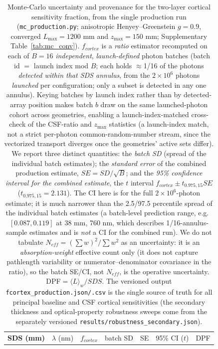 \documentclass[11pt]{article}
\def\mathrm#1{#1}%
\def\,{ }%
\begin{document}
\begin{table}[ht]
\centering
\caption{Monte-Carlo uncertainty and provenance for the two-layer cortical sensitivity fraction, from the single production run (\texttt{mc\_production.py}; anisotropic Henyey--Greenstein $g=0.9$, converged $L_{\max}=1200$\,mm and $z_{\max}=150$\,mm; Supplementary Table~\ref{tab:mc_conv}). $f_{\mathrm{cortex}}$ is a \emph{ratio} estimator recomputed on each of $B=16$ \emph{independent}, \emph{launch-defined} photon batches (batch id $=$ launch index mod $B$; each holds $\approx$1/16 of the photons \emph{detected within that SDS annulus}, from the $2\times10^{6}$ photons \emph{launched} per configuration; only a subset is detected in any one annulus). Keying batches by launch index rather than by detected-array position makes batch $b$ draw on the same launched-photon cohort across geometries, enabling a launch-index-matched cross-check of the CSF-ratio and $z_{\max}$ statistics (a launch-index match, not a strict per-photon common-random-number stream, since the vectorized transport diverges once the geometries' active sets differ). We report three distinct quantities: the \emph{batch SD} (spread of the individual batch estimates); the \emph{standard error} of the combined production estimate, $\mathrm{SE}=\mathrm{SD}/\sqrt{B}$; and the \emph{95\% confidence interval for the combined estimate}, the $t$ interval $f_{\mathrm{cortex}}\pm t_{0.975,15}\,\mathrm{SE}$ ($t_{0.975,15}=2.131$). The CI here is for the full $2\times10^{6}$-photon estimate; it is much narrower than the 2.5/97.5 percentile spread of the individual batch estimates (a batch-level prediction range, e.g.\ $[0.087,0.119]$ at 38\,mm, 760\,nm, which describes 1/16-annulus-sample estimates and is \emph{not} a CI for the combined run). We do not tabulate $N_{\mathrm{eff}}=(\sum w)^2/\sum w^2$ as an uncertainty: it is an \emph{absorption-weight} effective count only (it does not capture pathlength variability or numerator--denominator covariance in the ratio), so the batch SE/CI, not $N_{\mathrm{eff}}$, is the operative uncertainty. DPF$\,=\langle L\rangle_w/\mathrm{SDS}$. The versioned output \texttt{fcortex\_production.json/.csv} is the single source of truth for all principal baseline and CSF cortical sensitivities (the secondary thickness and optical-property robustness sweeps come from the separately versioned \texttt{results/robustness\_secondary.json}).}
\label{tab:mc_unc}
\begin{tabular}{@{}ccccccc@{}}
\toprule
\textbf{SDS (mm)} & $\lambda$ (nm) & $f_{\mathrm{cortex}}$ & batch SD & SE & 95\% CI ($t$) & DPF \\

\end{tabular}
\end{table}
\end{document}
